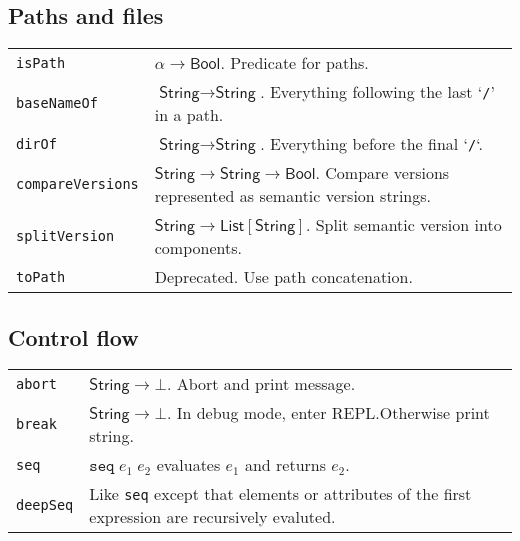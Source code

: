 \documentclass[9pt, a4paper, landscape]{extarticle}
\newcommand{\cmd}[1]{\texttt{#1}}
\newcommand{\str}{\textsf{String}}
\newcommand{\lst}{\textsf{List}}
\newcommand{\bln}{\textsf{Bool}}
\begin{document}
\begin{multicols*}{3}
\begin{tabularx}{\columnwidth}{@{}l>{\raggedright\arraybackslash}X@{}}
\end{tabularx}


\subsection{Paths and files}
\begin{tabularx}{\columnwidth}{@{}l>{\raggedright\arraybackslash}X@{}}
  \cmd{isPath} & $\alpha\to\bln$. Predicate for paths. \\

  \cmd{baseNameOf} & $\str\to\str$. Everything following the last
  `\cmd{/}' in a path. \\

  \cmd{dirOf} & $\str\to\str$. Everything before the final `\cmd{/}`. \\
  
  \cmd{compareVersions} & $\str\to\str\to\bln$. Compare versions
  represented as semantic version strings. \\
  
  \cmd{splitVersion} & $\str\to\lst[\str]$. Split semantic version into
  components. \\

  
  \cmd{toPath} & Deprecated. Use path concatenation. \\
\end{tabularx}


\subsection*{Control flow}

\begin{tabularx}{\columnwidth}{@{}l>{\raggedright\arraybackslash}X@{}}
  \cmd{abort} & $\str \to \bot $. Abort and print message. \\

  \cmd{break} & $\str \to \bot $. In debug mode, enter REPL.\@ Otherwise
  print string.\\

  \cmd{seq}  & $\cmd{seq} \; e_1 \; e_2$ evaluates $e_1$ and returns $e_2$.  \\

  \cmd{deepSeq} & Like \cmd{seq} except that elements or attributes of
  the first expression are recursively evaluted. \\ 
  

\end{tabularx}
\end{multicols*}
\end{document}
